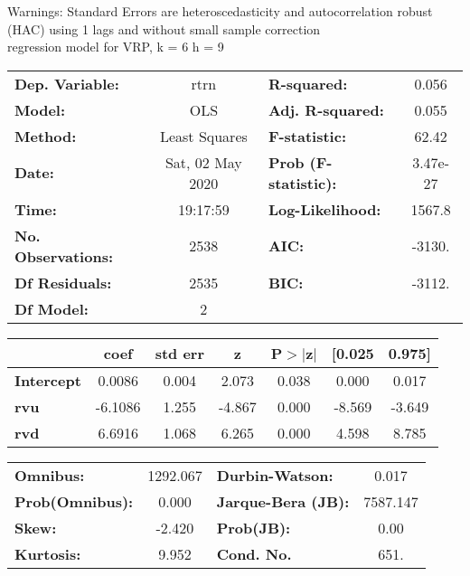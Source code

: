 Warnings: \newline
 [1] Standard Errors are heteroscedasticity and autocorrelation robust (HAC) using 1 lags and without small sample correction\\ 

regression model for VRP, k = 6 h = 9\begin{center}
\begin{tabular}{lclc}
\toprule
\textbf{Dep. Variable:}    &       rtrn       & \textbf{  R-squared:         } &     0.056   \\
\textbf{Model:}            &       OLS        & \textbf{  Adj. R-squared:    } &     0.055   \\
\textbf{Method:}           &  Least Squares   & \textbf{  F-statistic:       } &     62.42   \\
\textbf{Date:}             & Sat, 02 May 2020 & \textbf{  Prob (F-statistic):} &  3.47e-27   \\
\textbf{Time:}             &     19:17:59     & \textbf{  Log-Likelihood:    } &    1567.8   \\
\textbf{No. Observations:} &        2538      & \textbf{  AIC:               } &    -3130.   \\
\textbf{Df Residuals:}     &        2535      & \textbf{  BIC:               } &    -3112.   \\
\textbf{Df Model:}         &           2      & \textbf{                     } &             \\
\bottomrule
\end{tabular}
\begin{tabular}{lcccccc}
                   & \textbf{coef} & \textbf{std err} & \textbf{z} & \textbf{P$> |$z$|$} & \textbf{[0.025} & \textbf{0.975]}  \\
\midrule
\textbf{Intercept} &       0.0086  &        0.004     &     2.073  &         0.038        &        0.000    &        0.017     \\
\textbf{rvu}       &      -6.1086  &        1.255     &    -4.867  &         0.000        &       -8.569    &       -3.649     \\
\textbf{rvd}       &       6.6916  &        1.068     &     6.265  &         0.000        &        4.598    &        8.785     \\
\bottomrule
\end{tabular}
\begin{tabular}{lclc}
\textbf{Omnibus:}       & 1292.067 & \textbf{  Durbin-Watson:     } &    0.017  \\
\textbf{Prob(Omnibus):} &   0.000  & \textbf{  Jarque-Bera (JB):  } & 7587.147  \\
\textbf{Skew:}          &  -2.420  & \textbf{  Prob(JB):          } &     0.00  \\
\textbf{Kurtosis:}      &   9.952  & \textbf{  Cond. No.          } &     651.  \\
\bottomrule
\end{tabular}
\end{center}

